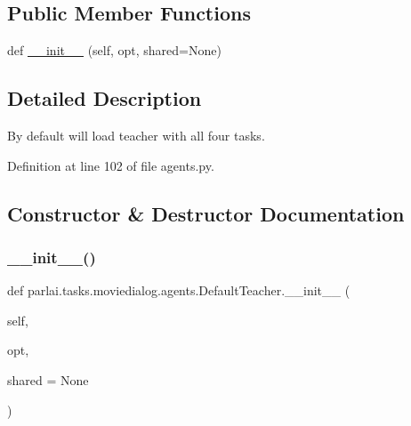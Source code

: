 \subsection*{Public Member Functions}
\begin{DoxyCompactItemize}
\item 
def \hyperlink{classparlai_1_1tasks_1_1moviedialog_1_1agents_1_1DefaultTeacher_a80e2f5fa10d6a6d884fca5ca97fe2e29}{\+\_\+\+\_\+init\+\_\+\+\_\+} (self, opt, shared=None)
\end{DoxyCompactItemize}


\subsection{Detailed Description}
\begin{DoxyVerb}By default will load teacher with all four tasks.
\end{DoxyVerb}
 

Definition at line 102 of file agents.\+py.



\subsection{Constructor \& Destructor Documentation}
\mbox{\label{classparlai_1_1tasks_1_1moviedialog_1_1agents_1_1DefaultTeacher_a80e2f5fa10d6a6d884fca5ca97fe2e29}} 
\subsubsection{\texorpdfstring{\+\_\+\+\_\+init\+\_\+\+\_\+()}{\_\_init\_\_()}}
{\footnotesize\ttfamily def parlai.\+tasks.\+moviedialog.\+agents.\+Default\+Teacher.\+\_\+\+\_\+init\+\_\+\+\_\+ (\begin{DoxyParamCaption}\item[{}]{self,  }\item[{}]{opt,  }\item[{}]{shared = {\ttfamily None} }\end{DoxyParamCaption})}

